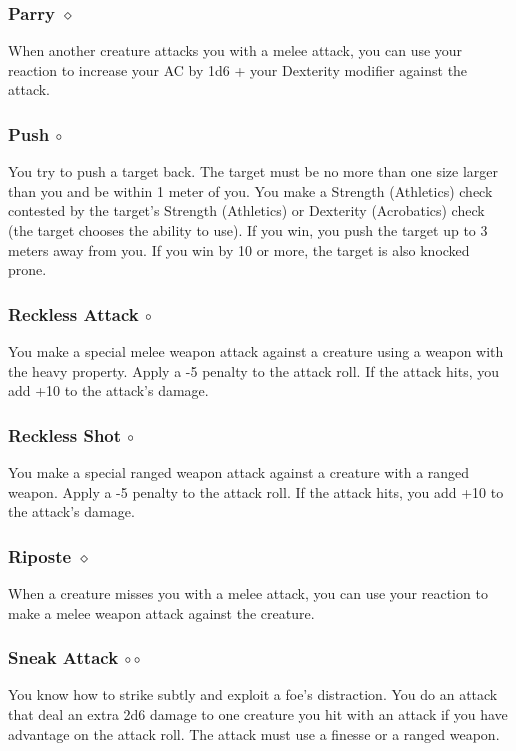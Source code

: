     \subsubsection{Parry $\diamond$} \label{act::parry}
        When another creature attacks you with a melee attack, you can use your reaction to increase your AC by 1d6 + your Dexterity modifier against the attack.
    \subsubsection{Push $\circ$} \label{act::push}
        You try to push a target back.
        The target must be no more than one size larger than you and be within 1 meter of you.
        You make a Strength (Athletics) check contested by the target's Strength (Athletics) or Dexterity (Acrobatics) check (the target chooses the ability to use).
        If you win, you push the target up to 3 meters away from you.
        If you win by 10 or more, the target is also knocked prone.
    \subsubsection{Reckless Attack $\circ$} \label{act::recklessattack}
        You make a special melee weapon attack against a creature using a weapon with the heavy property.
        Apply a -5 penalty to the attack roll.
        If the attack hits, you add +10 to the attack's damage.
    \subsubsection{Reckless Shot $\circ$} \label{act::recklessshot}
        You make a special ranged weapon attack against a creature with a ranged weapon.
        Apply a -5 penalty to the attack roll.
        If the attack hits, you add +10 to the attack's damage.
    \subsubsection{Riposte $\diamond$} \label{act::riposte}
        When a creature misses you with a melee attack, you can use your reaction to make a melee weapon attack against the creature.
    \subsubsection{Sneak Attack $\circ\circ$} \label{act::sneakattack}
        You know how to strike subtly and exploit a foe's distraction.
        You do an attack that deal an extra 2d6 damage to one creature you hit with an attack if you have advantage on the attack roll.
        The attack must use a finesse or a ranged weapon.

